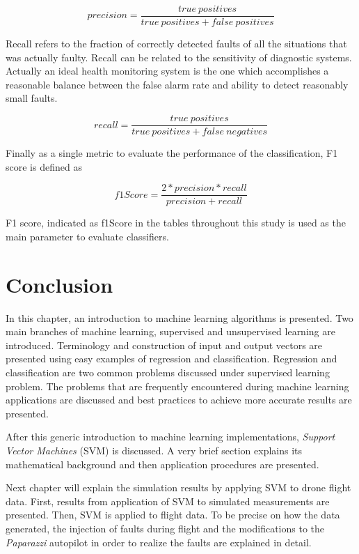 \begin{equation}
precision = \frac{true \ positives}{true \ positives + false \ positives}
\end{equation}

Recall refers to the fraction of correctly detected faults of all the situations that was actually faulty. 
Recall can be related to the sensitivity of diagnostic systems. 
Actually an ideal health monitoring system is the one which accomplishes a reasonable balance between the false alarm rate and ability to detect reasonably small faults. 

\begin{equation}
recall = \frac{true \ positives}{true \ positives + false \ negatives}
\end{equation}

Finally as a single metric to evaluate the performance of the classification, F1 score is defined as

\begin{equation}
f1Score = \frac{2 * precision * recall}{precision + recall}
\end{equation}

F1 score, indicated as f1Score in the tables throughout this study is used as the main parameter to evaluate classifiers.

\section{Conclusion}
In this chapter, an introduction to machine learning algorithms is presented. 
Two main branches of machine learning, supervised and unsupervised learning are introduced. 
Terminology and construction of input and output vectors are presented using easy examples of regression and classification. 
Regression and classification are two common problems discussed under supervised learning problem. 
The problems that are frequently encountered during machine learning applications are discussed and best practices to achieve more accurate results are presented. 

After this generic introduction to machine learning implementations, \emph{Support Vector Machines} (SVM) is discussed.  
A very brief section explains its mathematical background and then application procedures are presented.

Next chapter will explain the simulation results by applying SVM to drone flight data. First, results from application of SVM to simulated measurements are presented. Then, SVM is applied to flight data. To be precise on how the data generated, the injection of faults during flight and the modifications to the \emph{Paparazzi} autopilot in order to realize the faults are explained in detail.